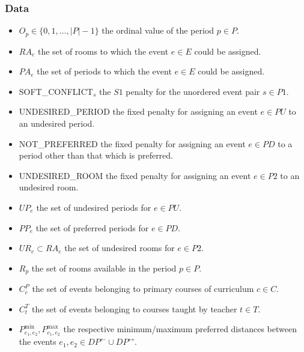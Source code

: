 \documentclass{article}
\theoremstyle{plain}
\numberwithin{theorem}{section}
\numberwithin{example}{section}
\theoremstyle{definition}
\begin{document}
\subsubsection*{Data}
\begin{itemize}
    \item $O_p \in \{0,1,\dots,|P| - 1\}$ the ordinal value of the period $p \in
        P$.
    \item $RA_e$ the set of rooms to which the event $e \in E$ could be
        assigned.
    \item $PA_e$ the set of periods to which the event $e \in E$ could be
        assigned.
    \item SOFT\_CONFLICT$_s$ the $S1$ penalty for the unordered event pair $s \in
        P1$.
    \item UNDESIRED\_PERIOD the fixed penalty for assigning an event $e \in PU$
        to an undesired period.
    \item NOT\_PREFERRED the fixed penalty for assigning an event $e \in PD$ to
        a period other than that which is preferred.
    \item UNDESIRED\_ROOM the fixed penalty for assigning an event $e \in P2$ to
        an undesired room.
    \item $UP_e$ the set of undesired periods for $e \in PU$.
    \item $PP_e$ the set of preferred periods for $e \in PD$.
    \item $UR_e \subset RA_e$ the set of undesired rooms for $e \in P2$.
    \item $R_p$ the set of rooms available in the period $p \in P$.
    \item $C^P_c$ the set of events belonging to primary courses of curriculum
        $c \in C$.
    \item $C^T_t$ the set of events belonging to courses taught by teacher $t
        \in T$.
    \item $P_{e_1, e_2}^\text{min}, P_{e_1, e_2}^\text{max}$ the respective
        minimum/maximum preferred distances between the events $e_1, e_2 \in
        DP^\leftarrow \cup DP^\leftrightarrow$.
\end{itemize}
\end{document}
